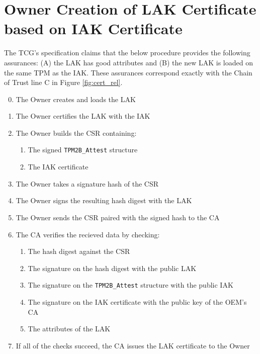 \section{Owner Creation of LAK Certificate based on IAK Certificate}

The TCG's specification claims that the below procedure provides the following assurances: (A) the LAK has good attributes and (B) the new LAK is  loaded on the same TPM as the IAK. These assurances correspond exactly with the Chain of Trust line C in Figure \ref{fig:cert_rel}. 
\begin{enumerate}[itemsep=0pt,parsep=0pt,partopsep=0pt]
  \setcounter{enumi}{-1}
  \item The Owner creates and loads the LAK
  \item The Owner certifies the LAK with the IAK
  \item The Owner builds the CSR containing:
  \begin{enumerate}[topsep=0pt, itemsep=0pt,parsep=0pt,partopsep=0pt]
    \item The signed \verb|TPM2B_Attest| structure
    \item The IAK certificate
  \end{enumerate}
  \item The Owner takes a signature hash of the CSR
  \item The Owner signs the resulting hash digest with the LAK
  \item The Owner sends the CSR paired with the signed hash to the CA
  \item The CA verifies the recieved data by checking:
  \begin{enumerate}[topsep=0pt, itemsep=0pt,parsep=0pt,partopsep=0pt]
    \item The hash digest against the CSR
    \item The signature on the hash digest with the public LAK
    \item The signature on the \verb|TPM2B_Attest| structure with the public IAK
    \item The signature on the IAK certificate with the public key of the OEM's CA
    \item The attributes of the LAK
  \end{enumerate}
  \item If all of the checks succeed, the CA issues the LAK certificate to the Owner
\end{enumerate}


